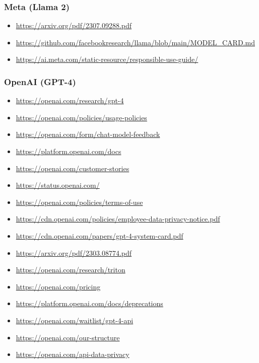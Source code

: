 \subsubsection{Meta (Llama 2)}
\begin{itemize}
    \item \url{https://arxiv.org/pdf/2307.09288.pdf}
    \item \url{https://github.com/facebookresearch/llama/blob/main/MODEL_CARD.md}
    \item \url{https://ai.meta.com/static-resource/responsible-use-guide/}
\end{itemize}

\clearpage

\subsubsection{OpenAI (GPT-4)}
\begin{itemize}
    \item \url{https://openai.com/research/gpt-4}
    \item \url{https://openai.com/policies/usage-policies}
    \item \url{https://openai.com/form/chat-model-feedback}
    \item \url{https://platform.openai.com/docs}
    \item \url{https://openai.com/customer-stories}
    \item \url{https://status.openai.com/}
    \item \url{https://openai.com/policies/terms-of-use}
    \item \url{https://cdn.openai.com/policies/employee-data-privacy-notice.pdf}
    \item \url{https://cdn.openai.com/papers/gpt-4-system-card.pdf}
    \item \url{https://arxiv.org/pdf/2303.08774.pdf}
    \item \url{https://openai.com/research/triton}
    \item \url{https://openai.com/pricing}
    \item \url{https://platform.openai.com/docs/deprecations}
    \item \url{https://openai.com/waitlist/gpt-4-api}
    \item \url{https://openai.com/our-structure}
    \item \url{https://openai.com/api-data-privacy}
\end{itemize}

